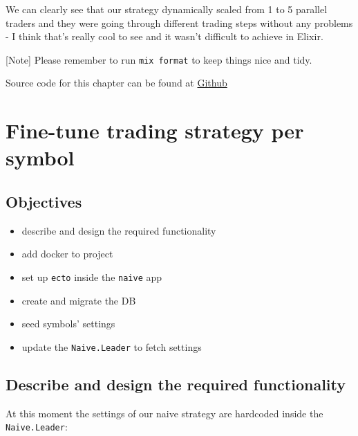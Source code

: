 \documentclass[
  oneside]{book}
\providecommand{\tightlist}{%
  \setlength{\itemsep}{0pt}\setlength{\parskip}{0pt}}
\begin{document}
We can clearly see that our strategy dynamically scaled from 1 to 5 parallel traders and they were going through different trading steps without any problems - I think that's really cool to see and it wasn't difficult to achieve in Elixir.

{[}Note{]} Please remember to run \texttt{mix\ format} to keep things nice and tidy.

Source code for this chapter can be found at \href{https://github.com/frathon/create-a-cryptocurrency-trading-bot-in-elixir-source-code/tree/chapter_09}{Github}

\hypertarget{fine-tune-trading-strategy-per-symbol}{%
\chapter{Fine-tune trading strategy per symbol}\label{fine-tune-trading-strategy-per-symbol}}

\hypertarget{objectives-9}{%
\section{Objectives}\label{objectives-9}}

\begin{itemize}
\tightlist
\item
  describe and design the required functionality
\item
  add docker to project
\item
  set up \texttt{ecto} inside the \texttt{naive} app
\item
  create and migrate the DB
\item
  seed symbols' settings
\item
  update the \texttt{Naive.Leader} to fetch settings
\end{itemize}

\hypertarget{describe-and-design-the-required-functionality-1}{%
\section{Describe and design the required functionality}\label{describe-and-design-the-required-functionality-1}}

At this moment the settings of our naive strategy are hardcoded inside the \texttt{Naive.Leader}:
\end{document}
